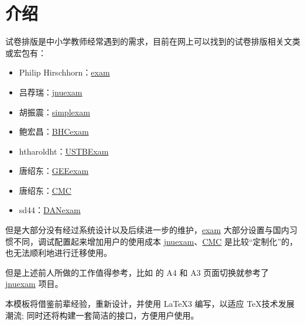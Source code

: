 
\section{介绍}

试卷排版是中小学教师经常遇到的需求，目前在网上可以找到的试卷排版相关文类或宏包有：
\begin{itemize}
  \item Philip Hirschhorn：\href{https://www.ctan.org/pkg/exam}{exam}
  \item 吕荐瑞：\href{https://www.ctan.org/pkg/jnuexam}{jnuexam}
  \item 胡振震：\href{https://github.com/hushidong/simplexam}{simplexam}
  \item 鲍宏昌：\href{https://github.com/mathedu4all/bhcexam}{BHCexam}
  \item htharoldht：\href{https://github.com/htharoldht/USTBExam}{USTBExam}
  \item 唐绍东：\href{https://github.com/shaodongtang/gaokao_exam}{GEEexam}
  \item 唐绍东：\href{https://github.com/shaodongtang/CMC}{CMC}
  \item sd44：\href{https://github.com/sd44/DANexam}{DANexam}
\end{itemize}

但是大部分没有经过系统设计以及后续进一步的维护，\href{https://www.ctan.org/pkg/exam}{exam} 大部分设置与国内习惯不同，调试配置起来增加用户的使用成本 \href{https://www.ctan.org/pkg/jnuexam}{jnuexam}、\href{https://github.com/shaodongtang/CMC}{CMC} 是比较“定制化”的，也无法顺利地进行迁移使用。

但是上述前人所做的工作值得参考，比如  的 A4 和 A3 页面切换就参考了 \href{https://www.ctan.org/pkg/jnuexam}{jnuexam} 项目。

本模板将借鉴前辈经验，重新设计，并使用 \LaTeX3 编写，以适应 \TeX 技术发展潮流; 同时还将构建一套简洁的接口，方便用户使用。